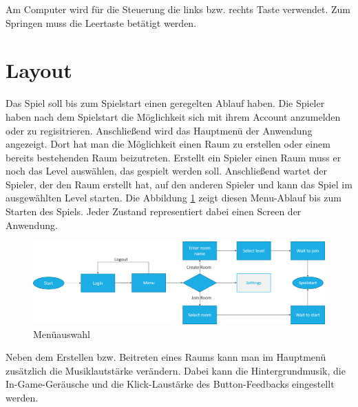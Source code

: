 Am Computer wird für die Steuerung die links bzw. rechts Taste verwendet. Zum Springen muss die Leertaste betätigt werden.


\section{Layout}
\label{sec:konzeption:layout}
Das Spiel soll bis zum Spielstart einen geregelten Ablauf haben. Die Spieler haben nach dem Spielstart die Möglichkeit sich mit ihrem Account anzumelden oder zu regisitrieren. Anschließend wird das Hauptmenü der Anwendung angezeigt. Dort hat man die Möglichkeit einen Raum zu erstellen oder einem bereits bestehenden Raum beizutreten. Erstellt ein Spieler einen Raum muss er noch das Level auswählen, das gespielt werden soll. Anschließend wartet der Spieler, der den Raum erstellt hat, auf den anderen Spieler und kann das Spiel im ausgewählten Level starten. Die Abbildung \ref{fig:konzeption:layout:menu} zeigt diesen Menu-Ablauf bis zum Starten des Spiels. Jeder Zustand representiert dabei einen Screen der Anwendung. 

\begin{figure}[H]
    \begin{center}
      \includegraphics[width=\linewidth]{img/konzeption/Spielablauf2}
      \caption{Menüauswahl}
      \label{fig:konzeption:layout:menu}
    \end{center}
\end{figure}

Neben dem Erstellen bzw. Beitreten eines Raums kann man im Hauptmenü zusätzlich die Musiklautstärke verändern. Dabei kann die Hintergrundmusik, die In-Game-Geräusche und die Klick-Laustärke des Button-Feedbacks eingestellt werden.